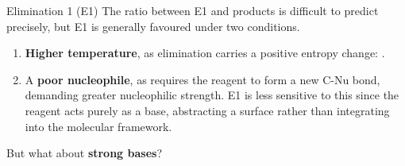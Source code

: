 \documentclass[10pt]{article}
\begin{document}
\begin{core}{Elimination 1 (E1)}
      The ratio between E1 and \sno products is difficult to predict precisely, but E1 is generally favoured under two conditions.

      \begin{enumerate}

        \item \textbf{Higher temperature}, as elimination carries a positive entropy change: .

        \item A \textbf{poor nucleophile}, as \sno requires the reagent to form a new C-Nu bond, demanding greater nucleophilic strength. E1 is less sensitive to this since the reagent acts purely as a base, abstracting a surface  rather than integrating into the molecular framework.
          
      \end{enumerate}

      But what about \textbf{strong bases}?

    \end{core}
\end{document}
